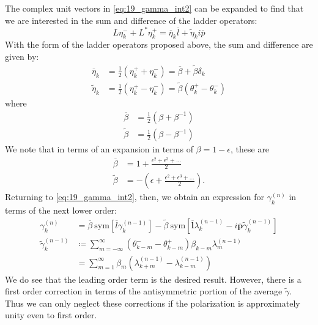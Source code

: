 The complex unit vectors in \cref{eq:19_gamma_int2} can be expanded to find that we are interested in the sum and difference of the ladder operators:
\begin{equation}
L\eta_{k}^{-} + L^{*}\eta_{k}^{+} = {\overline{\eta}}_{k}\overline{l} + {\widetilde{\eta}}_{k}i\overline{p}
\end{equation}
With the form of the ladder operators proposed above, the sum and difference are given by:
\begin{subequations}
\begin{align}
{\overline{\eta}}_{k} &= \frac{1}{2}\left( \eta_{k}^{+} + \eta_{k}^{-} \right) = \overline{\beta} + \widetilde{\beta}\delta_{k}    \\
{\widetilde{\eta}}_{k} &= \frac{1}{2}\left( \eta_{k}^{+} - \eta_{k}^{-} \right) = \widetilde{\beta}\left( \theta_{k}^{+} - \theta_{k}^{-} \right)
\end{align}
\end{subequations}
where 
\begin{subequations}
\begin{align}
    \overline{\beta} &= \frac{1}{2}\left( \beta + \beta^{- 1} \right)\\
    \widetilde{\beta} &= \frac{1}{2}\left( \beta - \beta^{- 1} \right)
\end{align}
\end{subequations}
We note that in terms of an expansion in terms of \(\beta = 1 - \epsilon\), these are
\begin{subequations}
\begin{align}
    \overline{\beta} &= 1 + \frac{\epsilon^{2} + \epsilon^{3} + \ldots}{2}\\
    \widetilde{\beta} &= - \left( \epsilon + \frac{\epsilon^{2} + \epsilon^{3} + \ldots}{2} \right).
\end{align}
\end{subequations}
Returning to \cref{eq:19_gamma_int2}, then, we obtain an expression for \(\gamma_{k}^{(n)}\) in terms of the next lower order:
\begin{align}
\gamma_{k}^{(n)} &= \overline{\beta}\ \text{sym}\left\lbrack \overline{l}\gamma_{k}^{(n - 1)} \right\rbrack - \widetilde{\beta}\ \text{sym}\left\lbrack \overline{\boldsymbol{l}}\lambda_{k}^{(n - 1)} - i\overline{\boldsymbol{p}}{\widetilde{\gamma}}_{k}^{(n - 1)} \right\rbrack\\
{\widetilde{\gamma}}_{k}^{(n - 1)} &\coloneqq \sum_{m = - \infty}^{\infty}{\left( \theta_{k - m}^{-} - \theta_{k - m}^{+} \right)\beta_{k - m}\lambda_{m}^{(n - 1)}}\\
&= \sum_{m = 1}^{\infty}{\beta_{m}\left( \lambda_{k + m}^{(n - 1)} - \lambda_{k - m}^{(n - 1)} \right)}
\end{align}
We do see that the leading order term is the desired result. However,
there is a first order correction in terms of the antisymmetric portion
of the average \(\widetilde{\gamma}.\) Thus we can only neglect these
corrections if the polarization is approximately unity even to first
order.

